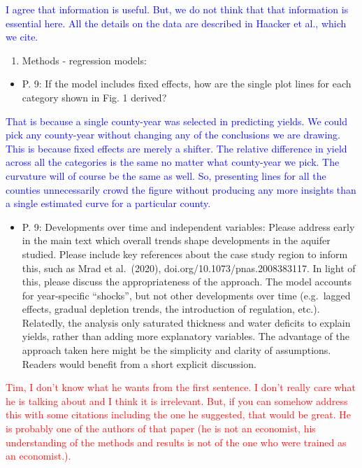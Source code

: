\documentclass[
]{article}
\providecommand{\tightlist}{%
  \setlength{\itemsep}{0pt}\setlength{\parskip}{0pt}}
\begin{document}
\textcolor{blue}{I agree that information is useful. But, we do not think that that information is essential here. All the details on the data are described in Haacker et al., which we cite.}

\begin{enumerate}
\def\labelenumi{\arabic{enumi}.}
\setcounter{enumi}{6}
\tightlist
\item
  Methods - regression models:
\end{enumerate}

\begin{itemize}
\tightlist
\item
  P. 9: If the model includes fixed effects, how are the single plot
  lines for each category shown in Fig. 1 derived?
\end{itemize}

\textcolor{blue}{
That is because a single county-year was selected in predicting yields. We could pick any county-year without changing any of the conclusions we are drawing. This is because fixed effects are merely a shifter. The relative difference in yield across all the categories is the same no matter what county-year we pick. The curvature will of course be the same as well. So, presenting lines for all the counties unnecessarily crowd the figure without producing any more insights than a single estimated curve for a particular county.
}

\begin{itemize}
\tightlist
\item
  P. 9: Developments over time and independent variables: Please address
  early in the main text which overall trends shape developments in the
  aquifer studied. Please include key references about the case study
  region to inform this, such as Mrad et al.~(2020),
  doi.org/10.1073/pnas.2008383117. In light of this, please discuss the
  appropriateness of the approach. The model accounts for year-specific
  ``shocks'', but not other developments over time (e.g.~lagged effects,
  gradual depletion trends, the introduction of regulation, etc.).
  Relatedly, the analysis only saturated thickness and water deficits to
  explain yields, rather than adding more explanatory variables. The
  advantage of the approach taken here might be the simplicity and
  clarity of assumptions. Readers would benefit from a short explicit
  discussion.
\end{itemize}

\textcolor{red}{Tim, I don't know what he wants from the first sentence. I don't really care what he is talking about and I think it is irrelevant. But, if you can somehow address this with some citations including the one he suggested, that would be great. He is probably one of the authors of that paper (he is not an economist, his understanding of the methods and results is not of the one who were trained as an economist.).}
\end{document}
